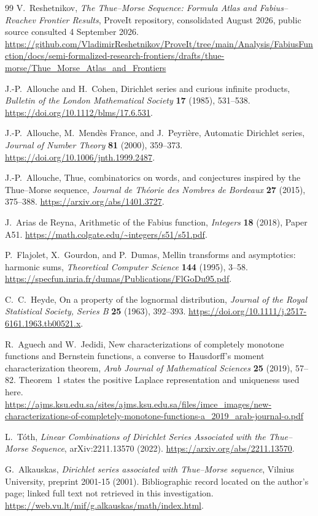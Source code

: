 \documentclass[11pt,letterpaper]{article}
\numberwithin{equation}{section}
\theoremstyle{definition}
\theoremstyle{remark}
\begin{document}
\clearpage
\begin{thebibliography}{99}
V.~Reshetnikov, \emph{The Thue--Morse Sequence: Formula Atlas and
Fabius--Rvachev Frontier Results}, ProveIt repository, consolidated
August 2026, public source consulted 4 September 2026.\\
\url{https://github.com/VladimirReshetnikov/ProveIt/tree/main/Analysis/FabiusFunction/docs/semi-formalized-research-frontiers/drafts/thue-morse/Thue_Morse_Atlas_and_Frontiers}

J.-P.~Allouche and H.~Cohen, Dirichlet series and curious infinite products,
\emph{Bulletin of the London Mathematical Society} \textbf{17} (1985),
531--538. \url{https://doi.org/10.1112/blms/17.6.531}.

J.-P.~Allouche, M.~Mend\`es France, and J.~Peyri\`ere,
Automatic Dirichlet series, \emph{Journal of Number Theory}
\textbf{81} (2000), 359--373.
\url{https://doi.org/10.1006/jnth.1999.2487}.

J.-P.~Allouche, Thue, combinatorics on words, and conjectures inspired by
the Thue--Morse sequence, \emph{Journal de Th\'eorie des Nombres de Bordeaux}
\textbf{27} (2015), 375--388.
\url{https://arxiv.org/abs/1401.3727}.

J.~Arias de Reyna, Arithmetic of the Fabius function,
\emph{Integers} \textbf{18} (2018), Paper A51.
\url{https://math.colgate.edu/~integers/s51/s51.pdf}.

P.~Flajolet, X.~Gourdon, and P.~Dumas,
Mellin transforms and asymptotics: harmonic sums,
\emph{Theoretical Computer Science} \textbf{144} (1995), 3--58.
\url{https://specfun.inria.fr/dumas/Publications/FlGoDu95.pdf}.

C.~C.~Heyde, On a property of the lognormal distribution,
\emph{Journal of the Royal Statistical Society, Series B}
\textbf{25} (1963), 392--393.
\url{https://doi.org/10.1111/j.2517-6161.1963.tb00521.x}.

R.~Aguech and W.~Jedidi, New characterizations of completely monotone
functions and Bernstein functions, a converse to Hausdorff's moment
characterization theorem, \emph{Arab Journal of Mathematical Sciences}
\textbf{25} (2019), 57--82. Theorem~1 states the positive Laplace
representation and uniqueness used here.\\
\url{https://ajms.ksu.edu.sa/sites/ajms.ksu.edu.sa/files/imce_images/new-characterizations-of-completely-monotone-functions-a_2019_arab-journal-o.pdf}

L.~T\'oth, \emph{Linear Combinations of Dirichlet Series Associated with the
Thue--Morse Sequence}, arXiv:2211.13570 (2022).
\url{https://arxiv.org/abs/2211.13570}.

G.~Alkauskas, \emph{Dirichlet series associated with Thue--Morse sequence},
Vilnius University, preprint 2001-15 (2001). Bibliographic record located
on the author's page; linked full text not retrieved in this investigation.\\
\url{https://web.vu.lt/mif/g.alkauskas/math/index.html}.
\end{thebibliography}
\end{document}
